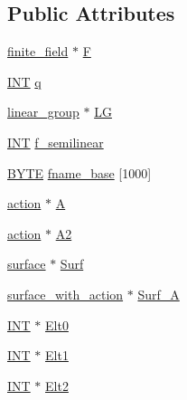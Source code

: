 \subsection*{Public Attributes}
\begin{DoxyCompactItemize}
\item 
\mbox{\hyperlink{classfinite__field}{finite\+\_\+field}} $\ast$ \mbox{\hyperlink{classsurface__classify__wedge_a38b41859ac3267ab89c2e277a9353c6c}{F}}
\item 
\mbox{\hyperlink{galois_8h_a09fddde158a3a20bd2dcadb609de11dc}{I\+NT}} \mbox{\hyperlink{classsurface__classify__wedge_aaaf0d5c091e37691475d81c720d64231}{q}}
\item 
\mbox{\hyperlink{classlinear__group}{linear\+\_\+group}} $\ast$ \mbox{\hyperlink{classsurface__classify__wedge_a6e2ce116a90902d7ad534c5a9b90a57a}{LG}}
\item 
\mbox{\hyperlink{galois_8h_a09fddde158a3a20bd2dcadb609de11dc}{I\+NT}} \mbox{\hyperlink{classsurface__classify__wedge_a07bff164634b636ba354e48a91c406b4}{f\+\_\+semilinear}}
\item 
\mbox{\hyperlink{galois_8h_ab6cc7b4aeb6ea31aba2b3fbfc83ff5e6}{B\+Y\+TE}} \mbox{\hyperlink{classsurface__classify__wedge_a42bf804f840009b0471463f8e0e9680e}{fname\+\_\+base}} \mbox{[}1000\mbox{]}
\item 
\mbox{\hyperlink{classaction}{action}} $\ast$ \mbox{\hyperlink{classsurface__classify__wedge_af9a53a8a9296da21a3e2477863d08003}{A}}
\item 
\mbox{\hyperlink{classaction}{action}} $\ast$ \mbox{\hyperlink{classsurface__classify__wedge_a4f77df3491454b22f6c2a401fd694c72}{A2}}
\item 
\mbox{\hyperlink{classsurface}{surface}} $\ast$ \mbox{\hyperlink{classsurface__classify__wedge_a4bcca19b5ed18fdb0ff566d13716ffe9}{Surf}}
\item 
\mbox{\hyperlink{classsurface__with__action}{surface\+\_\+with\+\_\+action}} $\ast$ \mbox{\hyperlink{classsurface__classify__wedge_a65049aa872e3414264a0ffcdc48d8d15}{Surf\+\_\+A}}
\item 
\mbox{\hyperlink{galois_8h_a09fddde158a3a20bd2dcadb609de11dc}{I\+NT}} $\ast$ \mbox{\hyperlink{classsurface__classify__wedge_a8070436724b2df0d5aa3a164f1c72dcc}{Elt0}}
\item 
\mbox{\hyperlink{galois_8h_a09fddde158a3a20bd2dcadb609de11dc}{I\+NT}} $\ast$ \mbox{\hyperlink{classsurface__classify__wedge_a7a439ac19e55c2759d42ba897e9a586d}{Elt1}}
\item 
\mbox{\hyperlink{galois_8h_a09fddde158a3a20bd2dcadb609de11dc}{I\+NT}} $\ast$ \mbox{\hyperlink{classsurface__classify__wedge_af6b63953555206045cf3e47a210927ca}{Elt2}}

\end{DoxyCompactItemize}
